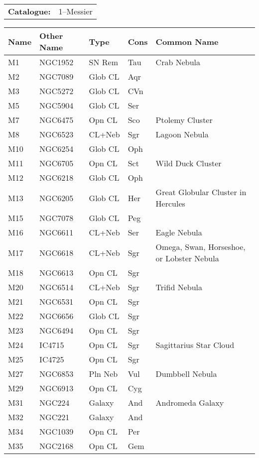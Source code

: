 \begin{tabular}{ p{0.9in} p{1.3in}}
{\bf Catalogue:} & 1--Messier \\ 
\end{tabular}
\begin{longtable}{ p{0.7in}  p{1.0in}  p{0.6in}  p{0.9in}  p{5.1in} }
\hline 
{\bf Name} & {\bf Other Name} & {\bf Type} & {\bf Cons} & {\bf Common Name} \\ 
\hline 
M1 & NGC1952 & SN Rem & Tau & Crab Nebula \\ 
M2 & NGC7089 & Glob CL & Aqr &  \\ 
M3 & NGC5272 & Glob CL & CVn &  \\ 
M5 & NGC5904 & Glob CL & Ser &  \\ 
M7 & NGC6475 & Opn CL & Sco & Ptolemy Cluster \\ 
M8 & NGC6523 & CL+Neb & Sgr & Lagoon Nebula \\ 
M10 & NGC6254 & Glob CL & Oph &  \\ 
M11 & NGC6705 & Opn CL & Sct & Wild Duck Cluster \\ 
M12 & NGC6218 & Glob CL & Oph &  \\ 
M13 & NGC6205 & Glob CL & Her & Great Globular Cluster in Hercules \\ 
M15 & NGC7078 & Glob CL & Peg &  \\ 
M16 & NGC6611 & CL+Neb & Ser & Eagle Nebula \\ 
M17 & NGC6618 & CL+Neb & Sgr & Omega, Swan, Horseshoe, or Lobster Nebula \\ 
M18 & NGC6613 & Opn CL & Sgr &  \\ 
M20 & NGC6514 & CL+Neb & Sgr & Trifid Nebula \\ 
M21 & NGC6531 & Opn CL & Sgr &  \\ 
M22 & NGC6656 & Glob CL & Sgr &  \\ 
M23 & NGC6494 & Opn CL & Sgr &  \\ 
M24 & IC4715 & Opn CL & Sgr & Sagittarius Star Cloud \\ 
M25 & IC4725 & Opn CL & Sgr &  \\ 
M27 & NGC6853 & Pln Neb & Vul & Dumbbell Nebula \\ 
M29 & NGC6913 & Opn CL & Cyg &  \\ 
M31 & NGC224 & Galaxy & And & Andromeda Galaxy \\ 
M32 & NGC221 & Galaxy & And &  \\ 
M34 & NGC1039 & Opn CL & Per &  \\ 
M35 & NGC2168 & Opn CL & Gem &  \\ 

\end{longtable}
